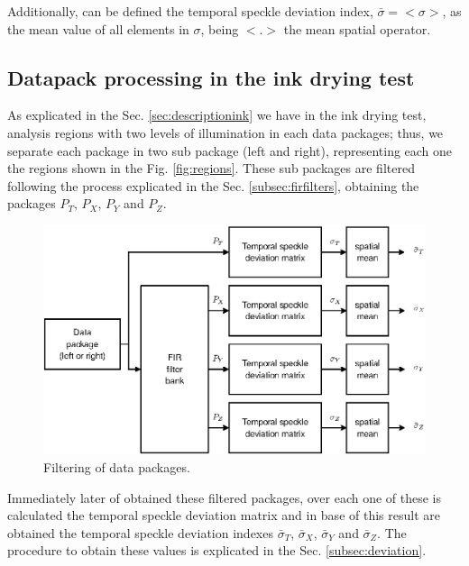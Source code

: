\documentclass[review]{elsarticle}
\begin{document}
Additionally, can be defined the temporal speckle deviation index, $\bar{\sigma}=<\sigma>$, as the mean value
of all elements in $\sigma$, being $<.>$ the mean spatial operator.

\subsection{Datapack processing in the ink drying test }
\label{subsec:numprocink}

As explicated in the Sec. \ref{sec:descriptionink} we have in the ink drying test, analysis regions  with
two levels of illumination in each data packages; thus, we  separate each package in two sub package
(left and right), representing each one the regions shown in the Fig. \ref{fig:regions}.
These sub packages are filtered following the process explicated in the Sec. \ref{subsec:firfilters},
obtaining the packages $P_T$, $P_X$, $P_Y$ and $P_Z$.
\begin{figure}[h!]
\centering
\includegraphics[width=0.65\columnwidth]{filtering.eps}
\caption{Filtering of data packages.}
\label{fig:filtering}
\end{figure}
Immediately later of obtained these filtered packages, over each one of these
is calculated the temporal speckle deviation matrix and in base of this result are obtained the 
temporal speckle deviation indexes $\bar{\sigma}_T$, $\bar{\sigma}_X$, $\bar{\sigma}_Y$ and
$\bar{\sigma}_Z$. The procedure to obtain these values is 
explicated in the Sec. \ref{subsec:deviation}.
\end{document}
